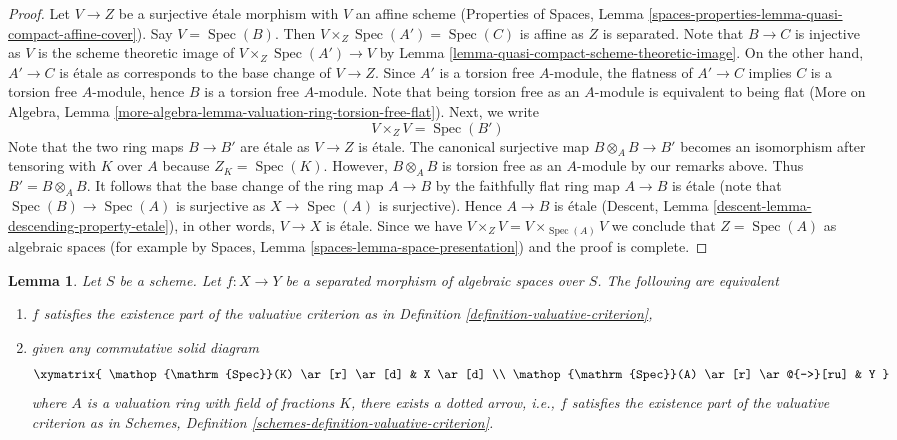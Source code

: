 \documentclass{stacks-project}
\theoremstyle{plain}
\newtheorem{lemma}[subsection]{Lemma}
\theoremstyle{definition}
\theoremstyle{remark}
\numberwithin{equation}{subsection}
\def\Spec{\mathop{\mathrm{Spec}}}
\begin{document}
\begin{proof}
\medskip\noindent
Let $V \to Z$ be a surjective \'etale morphism with $V$ an
affine scheme (Properties of Spaces, Lemma
\ref{spaces-properties-lemma-quasi-compact-affine-cover}).
Say $V = \Spec(B)$. Then $V \times_Z \Spec(A') = \Spec(C)$
is affine as $Z$ is separated. Note that $B \to C$ is injective
as $V$ is the scheme theoretic image of $V \times_Z \Spec(A') \to V$
by Lemma \ref{lemma-quasi-compact-scheme-theoretic-image}.
On the other hand, $A' \to C$ is \'etale as corresponds
to the base change of $V \to Z$.
Since $A'$ is a torsion free $A$-module,
the flatness of $A' \to C$ implies $C$ is a torsion free
$A$-module, hence $B$ is a torsion free $A$-module.
Note that being torsion free as an $A$-module is
equivalent to being flat (More on Algebra, Lemma
\ref{more-algebra-lemma-valuation-ring-torsion-free-flat}).
Next, we write
$$
V \times_Z V = \Spec(B')
$$
Note that the two ring maps $B \to B'$ are \'etale as $V \to Z$
is \'etale. The canonical surjective map $B \otimes_A B \to B'$
becomes an isomorphism after tensoring with $K$ over $A$
because $Z_K = \Spec(K)$. However, $B \otimes_A B$ is torsion
free as an $A$-module by our remarks above. Thus $B' = B \otimes_A B$.
It follows that the base change of the ring map
$A \to B$ by the faithfully flat ring map $A \to B$
is \'etale (note that $\Spec(B) \to \Spec(A)$ is surjective
as $X \to \Spec(A)$ is surjective). Hence $A \to B$ is
\'etale (Descent, Lemma \ref{descent-lemma-descending-property-etale}),
in other words, $V \to X$ is \'etale.
Since we have $V \times_Z V = V \times_{\Spec(A)} V$
we conclude that $Z = \Spec(A)$ as algebraic spaces
(for example by Spaces, Lemma \ref{spaces-lemma-space-presentation})
and the proof is complete.
\end{proof}

\begin{lemma}
\label{lemma-usual-enough}
Let $S$ be a scheme. Let $f : X \to Y$ be a separated morphism of
algebraic spaces over $S$. The following are equivalent
\begin{enumerate}
\item $f$ satisfies the existence part of the valuative criterion
as in Definition \ref{definition-valuative-criterion},
\item given any commutative solid diagram
$$
\xymatrix{
\Spec(K) \ar[r] \ar[d] & X \ar[d] \\
\Spec(A) \ar[r] \ar@{-->}[ru] & Y
}
$$
where $A$ is a valuation ring with field of fractions $K$, there exists
a dotted arrow, i.e., $f$ satisfies the existence part of the valuative
criterion as in
Schemes, Definition \ref{schemes-definition-valuative-criterion}.
\end{enumerate}
\end{lemma}
\end{document}
